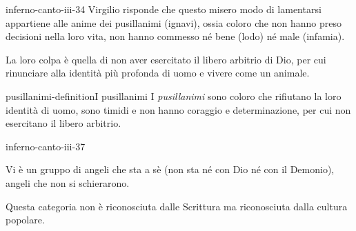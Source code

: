\documentclass[preview]{standalone}
\begin{document}
\begin{snippet}{inferno-canto-iii-34}
    Virgilio risponde che questo misero modo di lamentarsi appartiene
    alle anime dei pusillanimi (ignavi), ossia coloro che non hanno preso decisioni
    nella loro vita, non hanno commesso né bene (lodo) né male (infamia).
    
    La loro colpa è quella di non aver esercitato il libero arbitrio di Dio,
    per cui rinunciare alla identità più profonda di uomo e vivere come un animale.    
\end{snippet}

\begin{snippetdefinition}{pusillanimi-definition}{I pusillanimi}
    I \textit{pusillanimi} sono coloro che rifiutano la loro identità di uomo,
    sono timidi e non hanno coraggio e determinazione, per cui non esercitano il libero arbitrio.
\end{snippetdefinition}

\begin{snippet}{inferno-canto-iii-37}
    
    Vi è un gruppo di angeli che sta a sè (non sta né con Dio né con il Demonio), angeli che non si schierarono.

    Questa categoria non è riconosciuta dalle Scrittura ma riconosciuta dalla cultura popolare.
\end{snippet}
\end{document}
